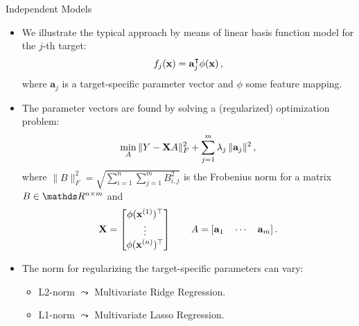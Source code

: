 \documentclass[11pt,compress,t,notes=noshow, xcolor=table]{beamer}
\newcommand{\ba}{\mathbf{a}}
\begin{document}
\begin{frame}{Independent Models}
%	
	\footnotesize
%	
	\begin{itemize}
%		
		\item 	We illustrate the typical approach by means of linear basis function model for the $j$-th target: 
		\begin{equation*}
			f_j(\xv) = \ba_j^\intercal \phi(\xv) \,,
			\label{eq:binrel}
		\end{equation*}
%	
		where $\ba_j$ is a target-specific parameter vector and $\phi$ some feature mapping.
%
		\item The parameter vectors are found by solving a (regularized) optimization problem: 
%		
		\begin{equation*}
			\label{eq:multiridge}
			\min_A \|Y - \Xmat A \|^2_F +  \sum_{j=1}^m \lambda_j \,\|\ba_j\|^2 \,,
		\end{equation*}
%	
		where $ \| B \|^2_F  = \sqrt{ \sum_{i=1}^n \sum_{j=1}^m B_{i,j}^2 } $ is the Frobenius norm for a matrix $B \in \R^{n \times m}$ and 
%		
		\begin{equation*}
			\label{eq:notation}
			\Xmat = \begin{bmatrix} \phi(\xv^{(1)})^\top \\ \vdots \\ \phi(\xv^{(n)})^\top \end{bmatrix} \qquad A = [\ba_1 \quad \cdots \quad \ba_m] \,.
		\end{equation*}
%
		\item The norm for regularizing the target-specific parameters can vary:
%		
			\begin{itemize} \footnotesize
%				
				\item L2-norm $\leadsto$ Multivariate Ridge Regression.
%				
				\item L1-norm $\leadsto$ Multivariate Lasso Regression.
%				
%				
			\end{itemize}
%	
	\end{itemize}
%
\end{frame}
\end{document}
